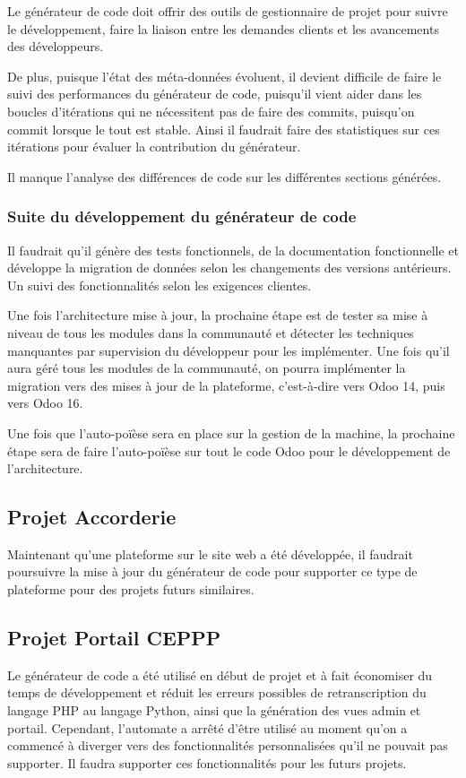Le générateur de code doit offrir des outils de gestionnaire de projet pour suivre le développement, faire la liaison entre les demandes clients et les avancements des développeurs.

De plus, puisque l’état des méta-données évoluent, il devient difficile de faire le suivi des performances du générateur de code, puisqu’il vient aider dans les boucles d’itérations qui ne nécessitent pas de faire des commits, puisqu’on commit lorsque le tout est stable. Ainsi il faudrait faire des statistiques sur ces itérations pour évaluer la contribution du générateur.

Il manque l’analyse des différences de code sur les différentes sections générées.

\subsubsection{Suite du développement du générateur de code}

Il faudrait qu’il génère des tests fonctionnels, de la documentation fonctionnelle et développe la migration de données selon les changements des versions antérieurs. Un suivi des fonctionnalités selon les exigences clientes.

Une fois l’architecture mise à jour, la prochaine étape est de tester sa mise à niveau de tous les modules dans la communauté et détecter les techniques manquantes par supervision du développeur pour les implémenter. Une fois qu’il aura géré tous les modules de la communauté, on pourra implémenter la migration vers des mises à jour de la plateforme, c’est-à-dire vers Odoo 14, puis vers Odoo 16.

Une fois que l’auto-poïèse sera en place sur la gestion de la machine, la prochaine étape sera de faire l’auto-poïèse sur tout le code Odoo pour le développement de l’architecture.

\subsection{Projet Accorderie}
Maintenant qu’une plateforme sur le site web a été développée, il faudrait poursuivre la mise à jour du générateur de code pour supporter ce type de plateforme pour des projets futurs similaires.

\subsection{Projet Portail CEPPP}
Le générateur de code a été utilisé en début de projet et à fait économiser du temps de développement et réduit les erreurs possibles de retranscription du langage PHP au langage Python, ainsi que la génération des vues admin et portail. Cependant, l’automate a arrêté d’être utilisé au moment qu’on a commencé à diverger vers des fonctionnalités personnalisées qu’il ne pouvait pas supporter. Il faudra supporter ces fonctionnalités pour les futurs projets.

